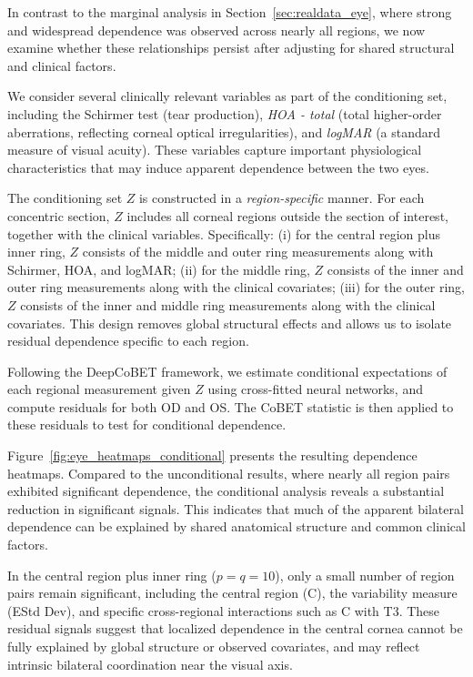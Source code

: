 \documentclass[12pt,reqno,oneside]{amsbook}
\theoremstyle{definition}
\theoremstyle{remark}
\begin{document}
In contrast to the marginal analysis in Section~\ref{sec:realdata_eye}, where strong and widespread dependence was observed across nearly all regions, we now examine whether these relationships persist after adjusting for shared structural and clinical factors.

We consider several clinically relevant variables as part of the conditioning set, including the Schirmer test (tear production), \emph{HOA - total} (total higher-order aberrations, reflecting corneal optical irregularities), and \emph{logMAR} (a standard measure of visual acuity). These variables capture important physiological characteristics that may induce apparent dependence between the two eyes.

The conditioning set $Z$ is constructed in a \emph{region-specific} manner. For each concentric section, $Z$ includes all corneal regions outside the section of interest, together with the clinical variables. Specifically:
(i) for the central region plus inner ring, $Z$ consists of the middle and outer ring measurements along with Schirmer, HOA, and logMAR;
(ii) for the middle ring, $Z$ consists of the inner and outer ring measurements along with the clinical covariates;
(iii) for the outer ring, $Z$ consists of the inner and middle ring measurements along with the clinical covariates.
This design removes global structural effects and allows us to isolate residual dependence specific to each region.

Following the DeepCoBET framework, we estimate conditional expectations of each regional measurement given $Z$ using cross-fitted neural networks, and compute residuals for both OD and OS. The CoBET statistic is then applied to these residuals to test for conditional dependence.

Figure~\ref{fig:eye_heatmaps_conditional} presents the resulting dependence heatmaps. Compared to the unconditional results, where nearly all region pairs exhibited significant dependence, the conditional analysis reveals a substantial reduction in significant signals. This indicates that much of the apparent bilateral dependence can be explained by shared anatomical structure and common clinical factors.

In the central region plus inner ring ($p=q=10$), only a small number of region pairs remain significant, including the central region (C), the variability measure (EStd Dev), and specific cross-regional interactions such as C with T3. These residual signals suggest that localized dependence in the central cornea cannot be fully explained by global structure or observed covariates, and may reflect intrinsic bilateral coordination near the visual axis.
\end{document}
